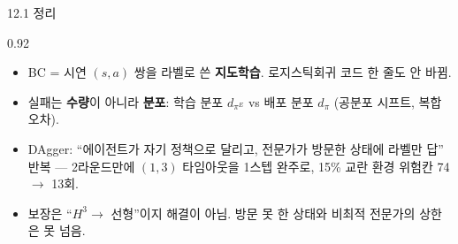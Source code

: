 \begin{frame}{12.1 정리}
\begin{center}\begin{varwidth}{0.92\textwidth}
  \begin{itemize}
    \item BC = 시연 $(s,a)$ 쌍을 라벨로 쓴 \textbf{지도학습}. 로지스틱회귀
      코드 한 줄도 안 바뀜.
    \item 실패는 \textbf{수량}이 아니라 \textbf{분포}: 학습 분포
      $d_{\pi^E}$ vs 배포 분포 $d_\pi$ (공분포 시프트, 복합 오차).
    \item DAgger: ``에이전트가 자기 정책으로 달리고, 전문가가 방문한
      상태에 라벨만 답'' 반복 — 2라운드만에 $(1,3)$ 타임아웃을
      1스텝 완주로, 15\% 교란 환경 위험칸 74 $\to$ 13회.
    \item 보장은 ``$H^3\to$ 선형''이지 해결이 아님. 방문 못 한 상태와
      비최적 전문가의 상한은 못 넘음.
  \end{itemize}
\end{varwidth}\end{center}
\end{frame}

